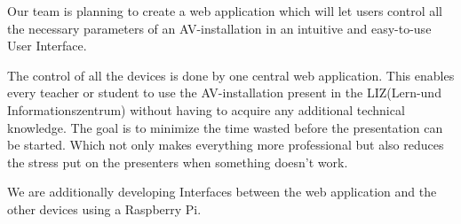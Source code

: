 Our team is planning to create a web application which will let users
control all the necessary parameters of an AV-installation in an
intuitive and easy-to-use User Interface.

The control of all the devices is done by one central web application.
This enables every teacher or student to use the AV-installation present
in the LIZ(Lern-und Informationszentrum) without having to acquire any
additional technical knowledge. The goal is to minimize the time wasted
before the presentation can be started. Which not only makes everything
more professional but also reduces the stress put on the presenters when
something doesn't work.

We are additionally developing Interfaces between the web application
and the other devices using a Raspberry Pi.

